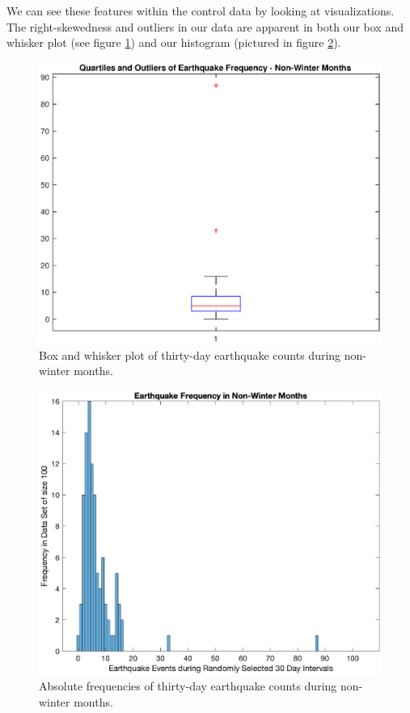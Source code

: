 \documentclass{amsart}
\begin{document}
We can see these features within the control data by looking at visualizations. The right-skewedness and outliers in our data are apparent in both our box and whisker plot (see figure \ref{F:BoxAndWhiskerEarthquake}) and our histogram (pictured in figure \ref{F:absoluteFrequencies}).
\begin{figure}
\centering
\includegraphics[scale=0.55]{boxplotfinal}
\caption{Box and whisker plot of thirty-day earthquake counts during non-winter months.\label{F:BoxAndWhiskerEarthquake}}
\end{figure}

\begin{figure}
\centering
\includegraphics[scale=0.55]{histogramfinal}
\caption{Absolute frequencies of thirty-day earthquake counts during non-winter months.\label{F:absoluteFrequencies}}
\end{figure}
\end{document}
